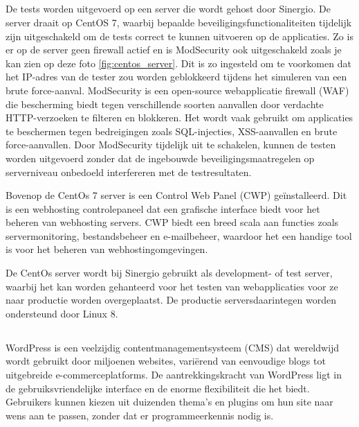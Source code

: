 \subsection{}
De tests worden uitgevoerd op een server die wordt gehost door Sinergio. De server draait op CentOS 7, waarbij bepaalde 
beveiligingsfunctionaliteiten tijdelijk zijn uitgeschakeld om de tests correct te kunnen uitvoeren op de applicaties. Zo is er op de server 
geen firewall actief en is ModSecurity ook uitgeschakeld zoals je kan zien op deze foto \ref{fig:centos_server}. Dit is 
zo ingesteld om te voorkomen dat het IP-adres van de tester zou worden geblokkeerd tijdens het simuleren van een brute 
force-aanval.\break
ModSecurity is een open-source webapplicatie firewall (WAF) die bescherming biedt tegen verschillende soorten aanvallen door 
verdachte HTTP-verzoeken te filteren en blokkeren. Het wordt vaak gebruikt om applicaties te beschermen tegen bedreigingen 
zoals SQL-injecties, XSS-aanvallen en brute force-aanvallen. Door ModSecurity tijdelijk uit te schakelen, kunnen de testen 
worden uitgevoerd zonder dat de ingebouwde beveiligingsmaatregelen op serverniveau onbedoeld interfereren met de testresultaten.

Bovenop de CentOs 7 server is een Control Web Panel (CWP) geïnstalleerd. Dit is een webhosting controlepaneel dat
een grafische interface biedt voor het beheren van webhosting servers. CWP biedt een breed scala aan functies zoals
servermonitoring, bestandsbeheer en e-mailbeheer, waardoor het een handige tool is voor het beheren van webhostingomgevingen.

De CentOs server wordt bij Sinergio gebruikt als development- of test server, waarbij het kan worden gehanteerd voor het 
testen van webapplicaties voor ze naar productie worden overgeplaatst. De productie serversdaarintegen worden ondersteund 
door Linux 8.

\subsection{}
WordPress is een veelzijdig contentmanagementsysteem (CMS) dat wereldwijd wordt gebruikt door miljoenen websites, variërend van 
eenvoudige blogs tot uitgebreide e-commerceplatforms. De aantrekkingskracht van WordPress ligt in de gebruiksvriendelijke 
interface en de enorme flexibiliteit die het biedt. Gebruikers kunnen kiezen uit duizenden thema's en plugins om hun site 
naar wens aan te passen, zonder dat er programmeerkennis nodig is. 

